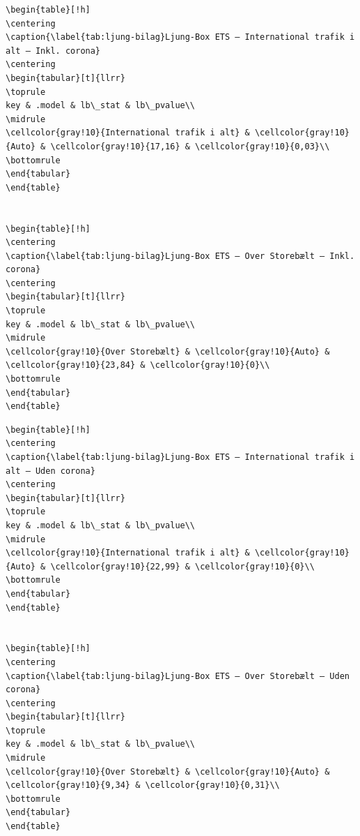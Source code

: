 \documentclass[
  danish,
]{article}
\begin{document}
\begin{verbatim}
\begin{table}[!h]
\centering
\caption{\label{tab:ljung-bilag}Ljung-Box ETS – International trafik i alt – Inkl. corona}
\centering
\begin{tabular}[t]{llrr}
\toprule
key & .model & lb\_stat & lb\_pvalue\\
\midrule
\cellcolor{gray!10}{International trafik i alt} & \cellcolor{gray!10}{Auto} & \cellcolor{gray!10}{17,16} & \cellcolor{gray!10}{0,03}\\
\bottomrule
\end{tabular}
\end{table}


\begin{table}[!h]
\centering
\caption{\label{tab:ljung-bilag}Ljung-Box ETS – Over Storebælt – Inkl. corona}
\centering
\begin{tabular}[t]{llrr}
\toprule
key & .model & lb\_stat & lb\_pvalue\\
\midrule
\cellcolor{gray!10}{Over Storebælt} & \cellcolor{gray!10}{Auto} & \cellcolor{gray!10}{23,84} & \cellcolor{gray!10}{0}\\
\bottomrule
\end{tabular}
\end{table}
\end{verbatim}

\begin{verbatim}
\begin{table}[!h]
\centering
\caption{\label{tab:ljung-bilag}Ljung-Box ETS – International trafik i alt – Uden corona}
\centering
\begin{tabular}[t]{llrr}
\toprule
key & .model & lb\_stat & lb\_pvalue\\
\midrule
\cellcolor{gray!10}{International trafik i alt} & \cellcolor{gray!10}{Auto} & \cellcolor{gray!10}{22,99} & \cellcolor{gray!10}{0}\\
\bottomrule
\end{tabular}
\end{table}


\begin{table}[!h]
\centering
\caption{\label{tab:ljung-bilag}Ljung-Box ETS – Over Storebælt – Uden corona}
\centering
\begin{tabular}[t]{llrr}
\toprule
key & .model & lb\_stat & lb\_pvalue\\
\midrule
\cellcolor{gray!10}{Over Storebælt} & \cellcolor{gray!10}{Auto} & \cellcolor{gray!10}{9,34} & \cellcolor{gray!10}{0,31}\\
\bottomrule
\end{tabular}
\end{table}
\end{verbatim}
\end{document}
